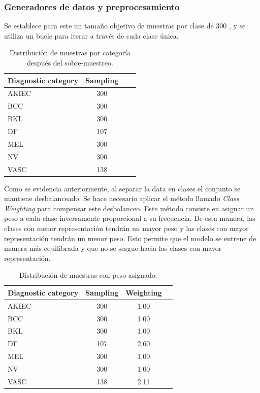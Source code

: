 \subsubsection*{Generadores de datos y preprocesamiento}

Se establece para este un tamaño objetivo de muestras por clase de $300$ , y se utiliza un bucle para iterar a través de cada clase única.

\begin{table}[H]
   \centering
   \begin{tabular}{lccc}
   \hline
   Diagnostic category & Sampling  \\ \hline
   AKIEC & 300 \\
   BCC & 300 \\
   BKL & 300 \\
   DF & 107 \\
   MEL & 300 \\
   NV & 300 \\
   VASC & 138 \\ \hline
   \end{tabular}
   \caption{Distribución de muestras por categoría después del sobre-muestreo.}
   \label{tab:sampling_distribution_1}
   \end{table}


Como se evidencia anteriormente, al separar la data en clases el conjunto se mantiene desbalanceado. Se hace necesario aplicar el método llamado \textit{Class Weighting} para compensar este desbalanceo. Este método consiste en asignar un peso a cada clase inversamente proporcional a su frecuencia. De esta manera, las clases con menor representación tendrán un mayor peso y las clases con mayor representación tendrán un menor peso. Esto permite que el modelo se entrene de manera más equilibrada y que no se sesgue hacia las clases con mayor representación.

\begin{table}[H]
   \centering
   \begin{tabular}{lccc}
   \hline
   Diagnostic category & Sampling  & Weighting\\ \hline
   AKIEC & 300 & 1.00\\
   BCC & 300 & 1.00\\
   BKL & 300 & 1.00\\
   DF & 107 & 2.60\\
   MEL & 300 & 1.00\\
   NV & 300 & 1.00\\
   VASC & 138 & 2.11\\ \hline
   \end{tabular}
   \caption{Distribución de muestras con peso asignado.}
   \label{tab:weighting_distribution}
   \end{table}


